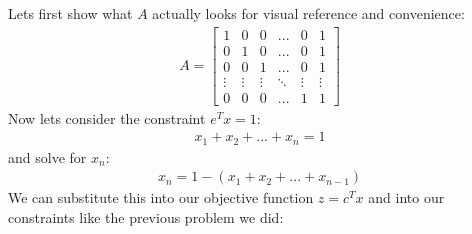 \documentclass{article}
\begin{document}
Lets first show what $A$ actually looks for visual reference and convenience:
\begin{align*} A = 
    \begin{bmatrix}
        1 & 0 & 0 & ... & 0 & 1 \\
        0 & 1 & 0 & ... & 0 & 1 \\
        0 & 0 & 1 & ... & 0 & 1 \\ 
        \vdots & \vdots & \vdots & \ddots & \vdots & \vdots \\
        0 & 0 & 0 & ... & 1 & 1
    \end{bmatrix}
\end{align*}
Now lets consider the constraint $e^Tx = 1$:
\begin{align*}
    x_1 + x_2 + ... + x_n = 1
\end{align*}
and solve for $x_n$:
\begin{align*}
    x_n = 1 - (x_1 + x_2 + ... + x_{n-1})
\end{align*}
We can substitute this into our objective function $z = c^Tx$ and into our constraints like the previous problem we did: 
\end{document}
